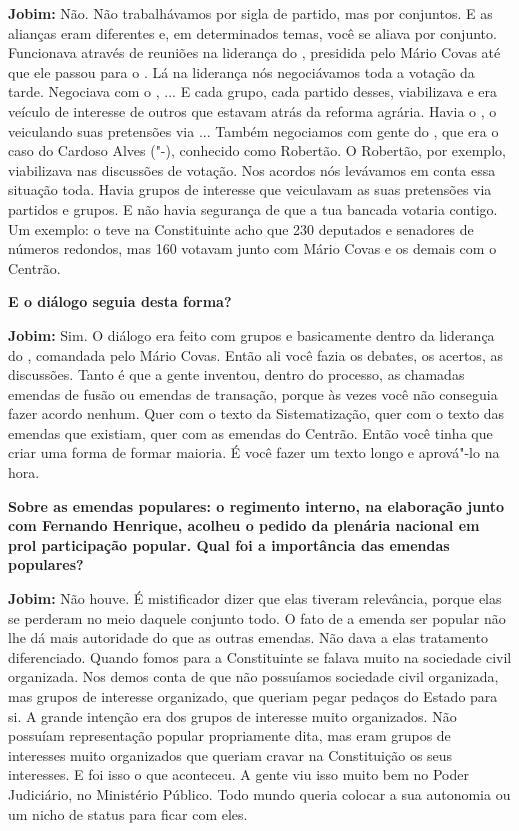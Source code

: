\textbf{Jobim:} Não. Não trabalhávamos por sigla de partido, mas por
conjuntos. E as alianças eram diferentes e, em determinados temas, você
se aliava por conjunto. Funcionava através de reuniões na liderança do
, presidida pelo Mário Covas até que ele passou para o . Lá na
liderança nós negociávamos toda a votação da tarde. Negociava com o ,
... E cada grupo, cada partido desses, viabilizava e era veículo de
interesse de outros que estavam atrás da reforma agrária. Havia o , o
 veiculando suas pretensões via ... Também negociamos com gente do
, que era o caso do Cardoso Alves ("-), conhecido como
Robertão. O Robertão, por exemplo, viabilizava nas discussões de
votação. Nos acordos nós levávamos em conta essa situação toda. Havia
grupos de interesse que veiculavam as suas pretensões via partidos e
grupos. E não havia segurança de que a tua bancada votaria contigo. Um
exemplo: o  teve na Constituinte acho que 230 deputados e senadores
de números redondos, mas 160 votavam junto com Mário Covas e os demais
com o Centrão.

\textbf{E o diálogo seguia desta forma?}

\textbf{Jobim:} Sim. O diálogo era feito com grupos e basicamente dentro
da liderança do , comandada pelo Mário Covas. Então ali você fazia
os debates, os acertos, as discussões. Tanto é que a gente inventou,
dentro do processo, as chamadas emendas de fusão ou emendas de
transação, porque às vezes você não conseguia fazer acordo nenhum. Quer
com o texto da Sistematização, quer com o texto das emendas que
existiam, quer com as emendas do Centrão. Então você tinha que criar uma
forma de formar maioria. É você fazer um texto longo e aprová"-lo na
hora.

\textbf{Sobre as emendas populares: o regimento interno, na elaboração
junto com Fernando Henrique, acolheu o pedido da plenária nacional em
prol participação popular. Qual foi a importância das emendas
populares?}

\textbf{Jobim:} Não houve. É mistificador dizer que elas tiveram
relevância, porque elas se perderam no meio daquele conjunto todo. O
fato de a emenda ser popular não lhe dá mais autoridade do que as outras
emendas. Não dava a elas tratamento diferenciado. Quando fomos para a
Constituinte se falava muito na sociedade civil organizada. Nos demos
conta de que não possuíamos sociedade civil organizada, mas grupos de
interesse organizado, que queriam pegar pedaços do Estado para si. A
grande intenção era dos grupos de interesse muito organizados. Não
possuíam representação popular propriamente dita, mas eram grupos de
interesses muito organizados que queriam cravar na Constituição os seus
interesses. E foi isso o que aconteceu. A gente viu isso muito bem no
Poder Judiciário, no Ministério Público. Todo mundo queria colocar a sua
autonomia ou um nicho de status para ficar com eles.

